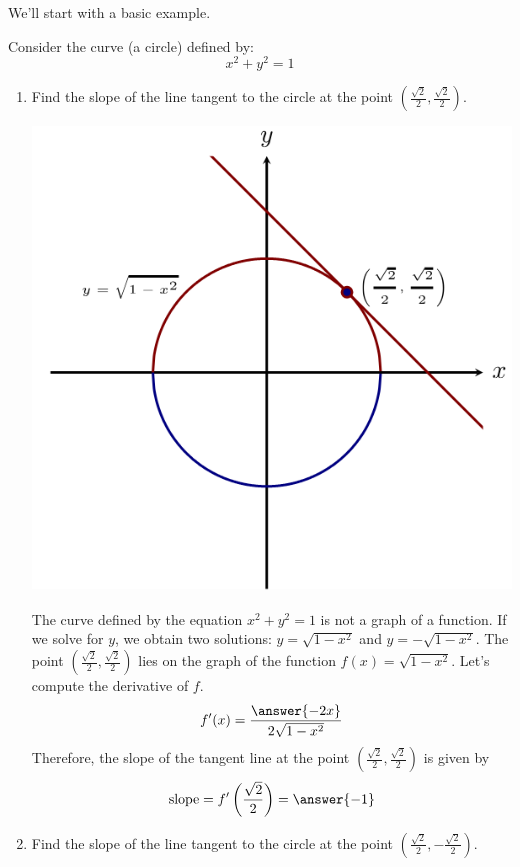 \documentclass{ximera}
\begin{document}
  
  We'll start with a basic example.
  \begin{example}
Consider the curve (a circle) defined by:
\[
x^2 + y^2 = 1
\]
\begin{enumerate}

\item Find the slope of the line tangent to the circle at the point $\left(\frac{\sqrt{2}}{2},\frac{\sqrt{2}}{2}\right)$.
\begin{explanation}
\begin{image}
    \includegraphics{0.png}
\end{image}

The curve defined by the equation  $x^2 + y^2 = 1$ is not a graph of a function. If we solve for $y$, we obtain two solutions:
$y=\sqrt{1-x^2}$ and $y=-\sqrt{1-x^2}$. 
The point $\left(\frac{\sqrt{2}}{2},\frac{\sqrt{2}}{2}\right)$ lies on the graph of the function $f(x)=\sqrt{1-x^2}$.
Let's compute the derivative of $f$.
\[
f'(x)=\frac{\answer{-2x}}{2\sqrt{1-x^2}}
\]
Therefore, the slope of the tangent line at the point $\left(\frac{\sqrt{2}}{2},\frac{\sqrt{2}}{2}\right)$ is given by
\[
\text{slope}=f'\left(\frac{\sqrt{2}}{2}\right)=\answer{-1}
\]
  \end{explanation}
\item Find the slope of the line tangent to the circle at the point $\left(\frac{\sqrt{2}}{2},-\frac{\sqrt{2}}{2}\right)$.


\end{enumerate}
\end{example}
\end{document}
